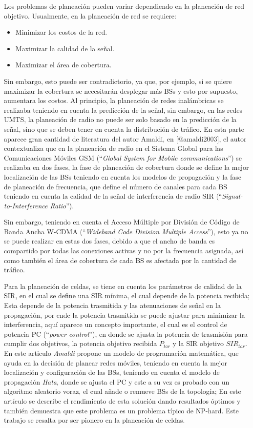 \documentclass[]{article}
\begin{document}
Los problemas de planeación pueden variar dependiendo en la planeación
de red objetivo. Usualmente, en la planeación de red se requiere:

\begin{itemize}
\item
  Minimizar los costos de la red.
\item
  Maximizar la calidad de la señal.
\item
  Maximizar el área de cobertura.
\end{itemize}

Sin embargo, esto puede ser contradictorio, ya que, por ejemplo, si se
quiere maximizar la cobertura se necesitarán desplegar más BSs y esto
por supuesto, aumentara los costos. Al principio, la planeación de redes
inalámbricas se realizaba teniendo en cuenta la predicción de la señal,
sin embargo, en las redes UMTS, la planeación de radio no puede ser solo
basado en la predicción de la señal, sino que se deben tener en cuenta
la distribución de tráfico. En esta parte aparece gran cantidad de
literatura del autor Amaldi, en {[}@amaldi2003{]}, el autor
contextualiza que en la planeación de radio en el Sistema Global para
las Comunicaciones Móviles GSM (``\emph{Global System for Mobile
communications}'') se realizaba en dos fases, la fase de planeación de
cobertura donde se define la mejor localización de las BSs teniendo en
cuenta los modelos de propagación y la fase de planeación de frecuencia,
que define el número de canales para cada BS teniendo en cuenta la
calidad de la señal de interferencia de radio SIR
(``\emph{Signal-to-Interference Ratio}'').

Sin embargo, teniendo en cuenta el Acceso Múltiple por División de
Código de Banda Ancha W-CDMA (``\emph{Wideband Code Division Multiple
Access}''), esto ya no se puede realizar en estas dos fases, debido a
que el ancho de banda es compartido por todas las conexiones activas y
no por la frecuencia asignada, así como también el área de cobertura de
cada BS es afectada por la cantidad de tráfico.

Para la planeación de celdas, se tiene en cuenta los parámetros de
calidad de la SIR, en el cual se define una SIR mínima, el cual depende
de la potencia recibida; Esta depende de la potencia trasmitida y las
atenuaciones de señal en la propagación, por ende la potencia trasmitida
se puede ajustar para minimizar la interferencia, aquí aparece un
concepto importante, el cual es el control de potencia PC (``\emph{power
control}''), en donde se ajusta la potencia de trasmisión para cumplir
dos objetivos, la potencia objetivo recibida \(P_{tar}\) y la SIR
objetivo \(SIR_{tar}\). En este articulo \emph{Amaldi} propone un modelo
de programación matemática, que ayuda en la decisión de planear redes
móviles, teniendo en cuenta la mejor localización y configuración de las
BSs, teniendo en cuenta el modelo de propagación \emph{Hata}, donde se
ajusta el PC y este a su vez es probado con un algoritmo aleatorio
voraz, el cual añade o remueve BSs de la topología; En este artículo se
describe el rendimiento de esta solución dando resultados óptimos y
también demuestra que este problema es un problema típico de NP-hard.
Este trabajo se resalta por ser pionero en la planeación de celdas.
\end{document}
